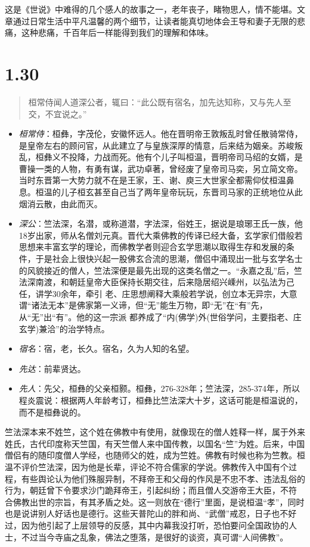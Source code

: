 \documentclass[]{book}
\providecommand{\tightlist}{%
  \setlength{\itemsep}{0pt}\setlength{\parskip}{0pt}}
\begin{document}
这是《世说》中难得的几个感人的故事之一，老年丧子，睹物思人，情不能堪。文章通过日常生活中平凡温馨的两个细节，让读者能真切地体会王导和妻子无限的悲痛，这种悲痛，千百年后一样能得到我们的理解和体味。

\section{1.30}\label{section-29}

\begin{quote}
桓常侍闻人道深公者，辄曰：``此公既有宿名，加先达知称，又与先人至交，不宜说之。''
\end{quote}

\begin{itemize}
\tightlist
\item
  \emph{桓常侍}：桓彝，字茂伦，安徽怀远人。他在晋明帝王敦叛乱时曾任散骑常侍，是皇帝左右的顾问官，从此建立了与皇族深厚的情意，后来结为姻亲。苏峻叛乱，桓彝义不投降，力战而死。他有个儿子叫桓温，晋明帝司马绍的女婿，是曹操一类的人物，有勇有谋，武功卓著，曾经废了皇帝司马奕，另立简文帝。当时东晋第一大势力就不在是王家，王、谢、庾三大世家全都需仰仗桓温鼻息。桓温的儿子桓玄甚至自己当了两年皇帝玩玩，东晋司马家的正统地位从此烟消云散，由此而灭。
\item
  \emph{深公}：竺法深，名潜，或称道潜，字法深，俗姓王，据说是琅琊王氏一族，他18岁出家，师从名僧刘元真。晋代大乘佛教的传译已经大备，玄学家们借般若思想来丰富玄学的理论，而佛教学者则迎合玄学思潮以取得生存和发展的条件，于是社会上很快兴起一股佛玄合流的思潮，僧侣中涌现出一批与玄学名士的风貌接近的僧人，竺法深便是最先出现的这类名僧之一。``永嘉之乱''后，竺法深南渡，和朝廷皇帝大臣保持长期交往，后来隐居绍兴嵊州，以弘法为己任，讲学30余年，牵引
  老、庄思想阐释大乘般若学说，创立本无异宗，大意谓``诸法无本''是佛家第一义谛，但``无''能生万物，即``无''在``有''先，从``无''出``有''。他的这一宗派
  都养成了``内(佛学)外(世俗学问，主要指老、庄玄学)兼洽''的治学特点。
\item
  \emph{宿名}：宿，老，长久。宿名，久为人知的名望。
\item
  \emph{先达}：前辈贤达。
\item
  \emph{先人}：先父，桓彝的父亲桓颢。桓彝，276-328年；竺法深，285-374年，所以程炎震说：根据两人年龄考订，桓彝比竺法深大十岁，这话可能是桓温说的，而不是桓彝说的。
\end{itemize}

竺法深本来不姓竺，这个姓在佛教中有使用，就像现在的僧人姓释一样，属于外来姓氏，古代印度称天竺国，有天竺僧人来中国传教，以国名``竺''为姓。后来，中国僧侣有的随印度僧人学经，也随师父的姓，成为竺姓。佛教有时候也称为竺教。桓温不评价竺法深，因为他是长辈，评论不符合儒家的学说。佛教传入中国有个过程，有些舆论认为他们殊服异制，不拜帝王和父母的作风是不忠不孝、违法乱俗的行为，朝廷曾下令要求沙门跪拜帝王，引起纠纷；而且僧人交游帝王大臣，不符
合佛教出世的宗旨，有其矛盾之处。这一则放在``德行''里面，是说桓温``孝''，同时也是说讲别人好话也是德行。这些天普陀山的胖和尚、``武僧''戒忍，日子也不好过，因为他引起了上层领导的反感，其中内幕我没打听，恐怕要问全国政协的人士，不过当今寺庙之乱象，佛法之堕落，是很好的谈资，真可谓``人间佛教''。
\end{document}
